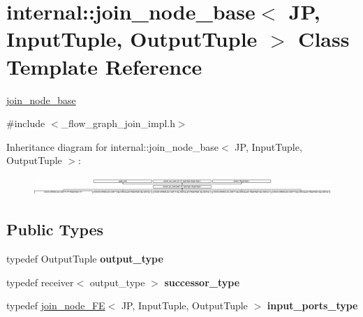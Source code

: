 \hypertarget{classinternal_1_1join__node__base}{}\section{internal\+:\+:join\+\_\+node\+\_\+base$<$ J\+P, Input\+Tuple, Output\+Tuple $>$ Class Template Reference}
\label{classinternal_1_1join__node__base}


\hyperlink{classinternal_1_1join__node__base}{join\+\_\+node\+\_\+base}  




{\ttfamily \#include $<$\+\_\+flow\+\_\+graph\+\_\+join\+\_\+impl.\+h$>$}

Inheritance diagram for internal\+:\+:join\+\_\+node\+\_\+base$<$ J\+P, Input\+Tuple, Output\+Tuple $>$\+:\begin{figure}[H]
\begin{center}
\leavevmode
\includegraphics[height=0.697095cm]{classinternal_1_1join__node__base}
\end{center}
\end{figure}
\subsection*{Public Types}
\begin{DoxyCompactItemize}
\item 
\hypertarget{classinternal_1_1join__node__base_a27cb31f4381df2fbadadbd8aa093e68a}{}typedef Output\+Tuple {\bfseries output\+\_\+type}\label{classinternal_1_1join__node__base_a27cb31f4381df2fbadadbd8aa093e68a}

\item 
\hypertarget{classinternal_1_1join__node__base_ab21d43f2706ec239e1c865d4fa071659}{}typedef receiver$<$ output\+\_\+type $>$ {\bfseries successor\+\_\+type}\label{classinternal_1_1join__node__base_ab21d43f2706ec239e1c865d4fa071659}

\item 
\hypertarget{classinternal_1_1join__node__base_af8118626f35837ec9ac89a2fbdd9aee6}{}typedef \hyperlink{classinternal_1_1join__node__FE}{join\+\_\+node\+\_\+\+F\+E}$<$ J\+P, Input\+Tuple, Output\+Tuple $>$ {\bfseries input\+\_\+ports\+\_\+type}\label{classinternal_1_1join__node__base_af8118626f35837ec9ac89a2fbdd9aee6}

\end{DoxyCompactItemize}
